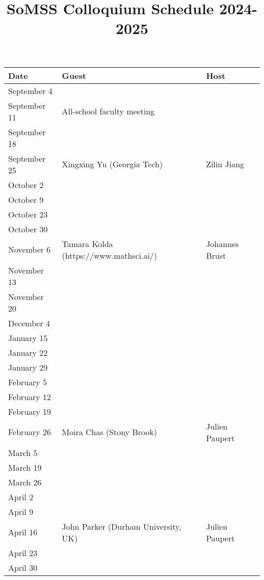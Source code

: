 \documentclass[11pt]{article}
\begin{document}
\title{SoMSS Colloquium Schedule 2024-2025}
\author{}
\date{}
\maketitle



\begin{table}[htp]
\begin{center}
\begin{tabular}{|l|l|l|}
\hline
Date & Guest & Host\\
\hline
September 4 & & \\
September 11 & All-school faculty meeting & \\
September 18 & & \\
September 25 & Xingxing Yu (Georgia Tech) & Zilin Jiang\\
October 2 & & \\
October 9 & & \\
October 23 & & \\
October 30 & & \\
November 6 & Tamara Kolda (https://www.mathsci.ai/) & Johannes Brust\\
November 13 & & \\
November 20 & & \\
December 4 & & \\
January 15 & & \\
January 22 & & \\
January 29 & & \\
February 5 & & \\
February 12 & & \\
February 19 & & \\
February 26  & Moira Chas (Stony Brook) & Julien Paupert \\
March 5 & & \\
March 19 & & \\
March 26 & & \\
April 2 & & \\
April 9 & & \\
April 16 & John Parker (Durham University, UK)& Julien Paupert \\
April 23 & & \\
April 30 & & \\
\hline
\end{tabular}
\end{center}
\label{default}
\end{table}%
\end{document}
